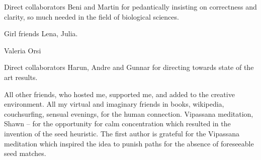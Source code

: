 Direct collaborators Beni and Martin for pedantically insisting on correctness
and clarity, so much needed in the field of biological sciences.

Girl friends Lena, Julia.

Valeria Orsi 

Direct collaborators Harun, Andre and Gunnar for directing towards state of the art results.

All other friends, who hosted me, supported
me, and added to the creative environment.
All my virtual and imaginary friends in books, wikipedia, couchsurfing, sensual
evenings, for the human connection. 
Vipassana meditation, Shawn -- for the opportunity for calm concentration which
resulted in the invention of the seed heuristic. The first author is grateful
for the Vipassana meditation which inspired the idea to punish paths for the
absence of foreseeable seed matches.

\endgroup
